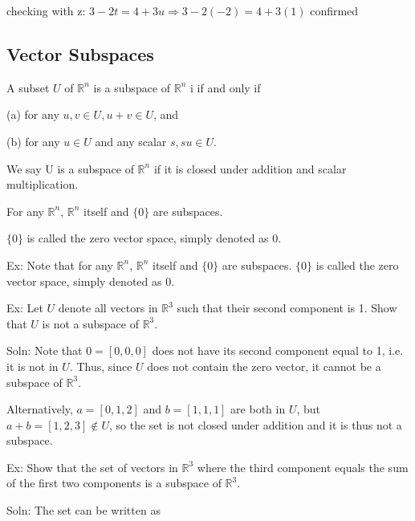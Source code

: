 \documentclass{extarticle}
\begin{document}
\begin{multicols}{2}
checking with z: $3-2t =4+3u \Rightarrow 3-2(-2)=4+3(1)$ confirmed 



\subsection{Vector Subspaces}
A subset $U$ of ${\mathbb{R}}^n$ is a subspace of ${\mathbb{R}}^n$ i if and only if

(a) for any $u, v \in U, u + v \in U$, and

(b) for any $u \in U$ and any scalar $s, su \in U$.

We say U is a subspace of ${\mathbb{R}}^n $ if it is closed under addition and scalar multiplication.

\smallskip
\smallskip



For any ${\mathbb{R}}^n $, ${\mathbb{R}}^n $ itself and $\{0\}$ are subspaces.

$\{0\}$ is called the zero vector space, simply denoted as 0.



Ex: Note that for any ${\mathbb{R}}^n $, ${\mathbb{R}}^n $ itself and $\{0\}$ are subspaces. $\{0\}$ is called the zero vector space, simply denoted as 0.

\begin{tcolorbox}[enhanced jigsaw,sharp corners,coltext=black,colback=BurntOrange!25!white,boxrule=0pt,breakable,size=minimal]



Ex: Let $U$ denote all vectors in ${\mathbb{R}}^3 $ such that their second component is 1. Show that $U$ is not a subspace of ${\mathbb{R}}^3 $.

Soln: Note that $0 = [0, 0, 0]$ does not have its second component equal to 1, i.e. it is not in $U$. Thus, since $U$ does not contain the zero vector, it cannot be a subspace of ${\mathbb{R}}^3 $.

Alternatively, $a = [0, 1, 2]$ and $b = [1, 1, 1]$ are both in $U$, but $a+b = [1, 2, 3] \notin U$, so the set is not closed under addition and it is thus not a subspace.


\end{tcolorbox}


Ex: Show that the set of vectors in ${\mathbb{R}}^3 $ where the third component equals the sum of the first two components is a subspace of ${\mathbb{R}}^3 $.

Soln: The set can be written as


\end{multicols}
\end{document}
